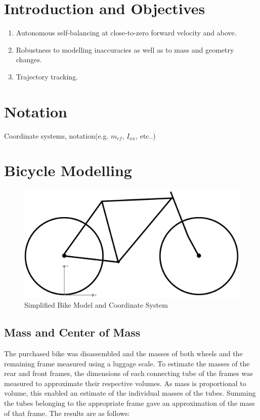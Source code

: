 \documentclass[a4paper]{article}
\begin{document}
\newpage

\setcounter{page}{2}
\tableofcontents

\newpage

\section{Introduction and Objectives}

\begin{enumerate}
\item Autonomous self-balancing at close-to-zero forward velocity and above.
\item Robustness to modelling inaccuracies as well as to mass and geometry changes.
\item Trajectory tracking.
\end{enumerate}

\section{Notation}

Coordinate systems, notation(e.g. $m_{rf}$, $I_{xx}$, etc..)

\section{Bicycle Modelling}

\begin{figure}[H]
\includegraphics[scale=0.2]{BikeAxes}
\centering
\caption{Simplified Bike Model and Coordinate System}
\end{figure}

\subsection{Mass and Center of Mass}
The purchased bike was disassembled and the masses of both wheels and the remaining frame measured using a luggage scale. To estimate the masses of the rear and front frames, the dimensions of each connecting tube of the frames was measured to approximate their respective volumes. As mass is proportional to volume, this enabled an estimate of the individual masses of the tubes. Summing the tubes belonging to the appropriate frame gave an approximation of the mass of that frame. The results are as follows:
\end{document}
